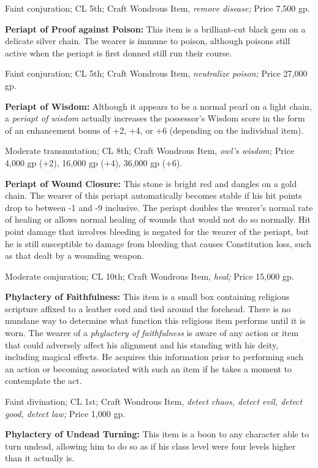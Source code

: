 Faint conjuration; CL 5th; Craft Wondrous Item, \textit{remove disease; }Price 
7,500 gp.

\textbf{Periapt of Proof against Poison: }This item is a brilliant-cut black gem 
on a delicate silver chain. The wearer is immune to poison, although poisons still 
active when the periapt is first donned still run their course.

Faint conjuration; CL 5th; Craft Wondrous Item, \textit{neutralize poison; }Price 
27,000 gp.

\textbf{Periapt of Wisdom:} Although it appears to be a normal pearl on a light 
chain, a \textit{periapt of wisdom }actually increases the possessor's Wisdom score 
in the form of an enhancement bonus of +2, +4, or +6 (depending on the individual 
item).

Moderate transmutation; CL 8th; Craft Wondrous Item, \textit{owl's wisdom; }Price 
4,000 gp (+2), 16,000 gp (+4), 36,000 gp (+6).

\textbf{Periapt of Wound Closure:} This stone is bright red and dangles on a gold 
chain. The wearer of this periapt automatically becomes stable if his hit points 
drop to between -1 and -9 inclusive. The periapt doubles the wearer's normal rate 
of healing or allows normal healing of wounds that would not do so normally. Hit 
point damage that involves bleeding is negated for the wearer of the periapt, but 
he is still susceptible to damage from bleeding that causes Constitution loss, 
such as that dealt by a wounding weapon.

Moderate conjuration; CL 10th; Craft Wondrous Item, \textit{heal; }Price 15,000 
gp.

\textbf{Phylactery of Faithfulness:} This item is a small box containing religious 
scripture affixed to a leather cord and tied around the forehead. There is no mundane 
way to determine what function this religious item performs until it is worn. The 
wearer of a \textit{phylactery of faithfulness }is aware of any action or item 
that could adversely affect his alignment and his standing with his deity, including 
magical effects. He acquires this information prior to performing such an action 
or becoming associated with such an item if he takes a moment to contemplate the 
act.

Faint divination; CL 1st; Craft Wondrous Item, \textit{detect chaos, detect evil, 
detect good, detect law; }Price 1,000 gp.

\textbf{Phylactery of Undead Turning:} This item is a boon to any character able 
to turn undead, allowing him to do so as if his class level were four levels higher 
than it actually is.

